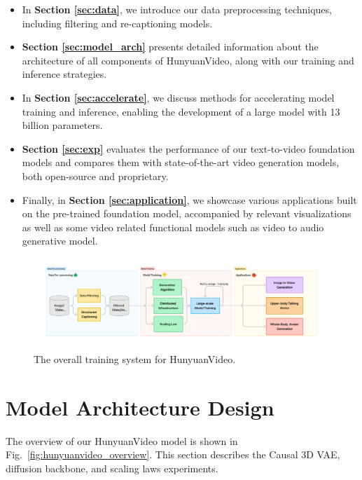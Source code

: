 \documentclass{article}
\newcommand{\nameofmethod}{HunyuanVideo}
\begin{document}
\begin{itemize}
    \item In \textbf{Section \ref{sec:data}}, we introduce our data preprocessing techniques, including filtering and re-captioning models.
    \item \textbf{Section \ref{sec:model_arch}} presents detailed information about the architecture of all components of \nameofmethod{}, along with our training and inference strategies.
    \item In \textbf{Section \ref{sec:accelerate}}, we discuss methods for accelerating model training and inference, enabling the development of a large model with 13 billion parameters.
    \item \textbf{Section \ref{sec:exp}} evaluates the performance of our text-to-video foundation models and compares them with state-of-the-art video generation models, both open-source and proprietary.
    \item Finally, in \textbf{Section \ref{sec:application}}, we showcase various applications built on the pre-trained foundation model, accompanied by relevant visualizations as well as some video related functional models such as video to audio generative model.
\end{itemize}
\begin{figure}[h]
    \hfill
    \includegraphics[width=\linewidth]{figures/overall.png}

    \caption{The overall training system for \nameofmethod{}.}
    \label{fig:pipeline_overview}
\end{figure}



\section{Model Architecture Design}
The overview of our \nameofmethod{} model is shown in Fig.~\ref{fig:hunyuanvideo_overview}. This section describes the Causal 3D VAE, diffusion backbone, and scaling laws experiments.
\end{document}
